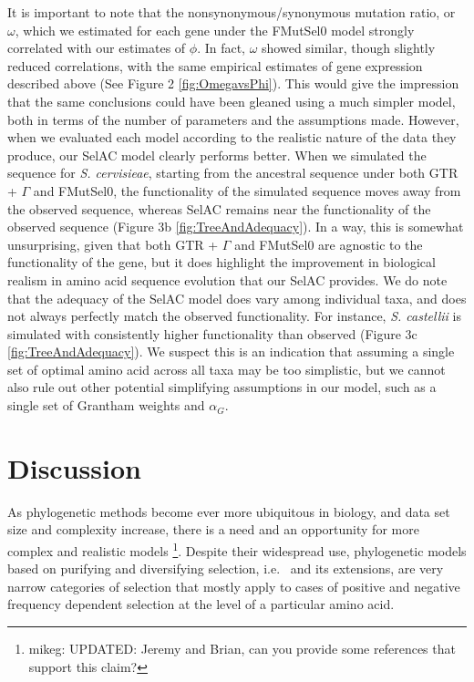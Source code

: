 \documentclass{article}
\newcommand{\alphag}{\ensuremath{\alpha_G}\xspace}
\begin{document}
It is important to note that the nonsynonymous/synonymous mutation ratio, or $\omega$, which we estimated for each gene under the FMutSel0 model strongly correlated with our estimates of $\phi$.
In fact, $\omega$ showed similar, though slightly reduced correlations, with the same empirical estimates of gene expression described above (See Figure 2 \ref{fig:OmegavsPhi}).
This would give the impression that the same conclusions could have been gleaned using a much simpler model, both in terms of the number of parameters and the assumptions made.
However, when we evaluated each model according to the realistic nature of the data they produce, our SelAC model clearly performs better.
When we simulated the sequence for \emph{S. cervisieae}, starting from the ancestral sequence under both GTR + $\Gamma$ and FMutSel0, the functionality of the simulated sequence moves away from the observed sequence, whereas SelAC remains near the functionality of the observed sequence (Figure 3b \ref{fig:TreeAndAdequacy}).
In a way, this is somewhat unsurprising, given that both GTR + $\Gamma$ and FMutSel0 are agnostic to the functionality of the gene, but it does highlight the improvement in biological realism in amino acid sequence evolution that our SelAC provides.
We do note that the adequacy of the SelAC model does vary among individual taxa, and does not always perfectly match the observed functionality.
For instance, \emph{S. castellii} is simulated with consistently higher functionality than observed (Figure 3c \ref{fig:TreeAndAdequacy}).
We suspect this is an indication that assuming a single set of optimal amino acid across all taxa may be too simplistic, but we cannot also rule out other potential simplifying assumptions in our model, such as a single set of Grantham weights and $\alphag$.




\section*{Discussion}
As phylogenetic methods become ever more ubiquitous in biology, and data set size and complexity increase, there is a need and an opportunity for more complex and realistic models \citep{GoldmanEtAl1996,ThorneEtAl1996,GoldmanEtAl1998,HalpernAndBruno1998,LartillotAndPhilippe2004} %
  \footnote{mikeg: UPDATED: Jeremy and Brian, can you provide some references that support this claim?}.
Despite their widespread use, phylogenetic models based on purifying and diversifying selection, i.e.~\citet{GoldmanAndYang1994} and its extensions, are very narrow categories of selection that mostly apply to cases of positive and negative frequency dependent selection at the level of a particular amino acid.
\end{document}
